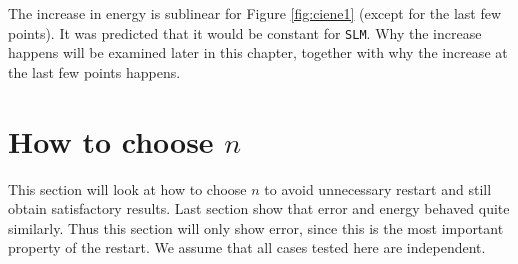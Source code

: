 \noindent The increase in energy is sublinear for Figure \ref{fig:ciene1} (except for the last few points). It was predicted that it would be constant for \texttt{SLM}. Why the increase happens will be examined later in this chapter, together with why the increase at the last few points happens.

\section{How to choose $n$}%
\label{sec:resultat}
This section will look at how to choose $n$ to avoid unnecessary restart and still obtain satisfactory results. Last section show that error and energy behaved quite similarly. Thus this section will only show error, since this is the most important property of the restart. We assume that all cases tested here are independent.

